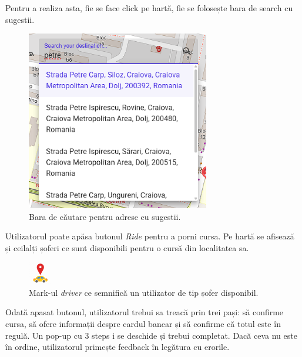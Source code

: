 Pentru a realiza asta, fie se face click pe hartă, fie se folosește bara de search cu sugestii.

\begin{figure}[H]
    \centering
    \includegraphics[width=8cm]{Assets/seach.png}
    \caption{Bara de căutare pentru adrese cu sugestii.}
    \label{fig:search}
\end{figure}

Utilizatorul poate apăsa butonul \textit{Ride} pentru a porni cursa.
Pe hartă se afisează și ceilalți șoferi ce sunt disponibili pentru o cursă din localitatea sa.

\begin{figure}[H]
    \centering
    \includegraphics[width=1cm]{Assets/driver.png}
    \caption{Mark-ul \textit{driver} ce semnifică un utilizator de tip șofer disponibil.}
    \label{fig:driver}
\end{figure}

Odată apasat butonul, utilizatorul trebui sa treacă prin trei pași: să confirme cursa,
să ofere informații despre cardul bancar și să confirme că totul este în regulă. Un pop-up 
cu 3 steps i se deschide și trebui completat. Dacă ceva nu este în ordine, utilizatorul primește
feedback în legătura cu erorile.

